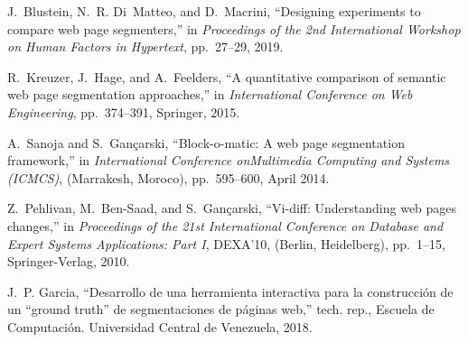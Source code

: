 \documentclass[10pt]{revecom}
\begin{document}
\begin{thebibliography}{10}
J.~Blustein, N.~R. Di~Matteo, and D.~Macrini, ``Designing experiments to
  compare web page segmenters,'' in {\em Proceedings of the 2nd International
  Workshop on Human Factors in Hypertext}, pp.~27--29, 2019.

R.~Kreuzer, J.~Hage, and A.~Feelders, ``A quantitative comparison of semantic
  web page segmentation approaches,'' in {\em International Conference on Web
  Engineering}, pp.~374--391, Springer, 2015.

A.~Sanoja and S.~Gan{\c c}arski, ``Block-o-matic: A web page segmentation
  framework,'' in {\em International Conference onMultimedia Computing and
  Systems (ICMCS)}, (Marrakesh, Moroco), pp.~595--600, April 2014.

Z.~Pehlivan, M.~Ben-Saad, and S.~Gan\c{c}arski, ``Vi-diff: Understanding web
  pages changes,'' in {\em Proceedings of the 21st International Conference on
  Database and Expert Systems Applications: Part I}, DEXA'10, (Berlin,
  Heidelberg), pp.~1--15, Springer-Verlag, 2010.

J.~P. Garcia, ``Desarrollo de una herramienta interactiva para la construcción
  de un ``ground truth'' de segmentaciones de páginas web,'' tech. rep.,
  Escuela de Computación. Universidad Central de Venezuela, 2018.

\end{thebibliography}
%


\end{document}
